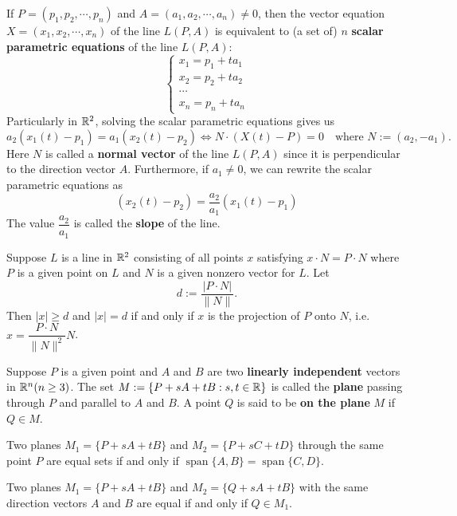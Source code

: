     \begin{remarkenv}
        If $P=(p_1,p_2,\cdots,p_n)$ and $A = (a_1,a_2,\cdots,a_n)\ne 0$, then the vector equation $X=(x_1,x_2,\cdots,x_n)$ of the line $L(P,A)$ is equivalent to (a set of) $n$ \textbf{scalar parametric equations} of the line $L(P,A)$:
        \[
        \begin{cases}
            x_1 = p_1 + t a_1 \\
            x_2 = p_2 + t a_2 \\
            \cdots \\
            x_n = p_n + t a_n
        \end{cases}
        \]
        Particularly in $\mathbb{R}^2$, solving the scalar parametric equations gives us
        \[
        a_2 (x_1(t) - p_1) = a_1 (x_2(t) - p_2) \Leftrightarrow N \cdot (X(t) - P) = 0 \quad \text{where } N := (a_2,-a_1).
        \]
        Here $N$ is called a \textbf{normal vector} of the line $L(P,A)$ since it is perpendicular to the direction vector $A$. Furthermore, if $a_1 \ne 0$, we can rewrite the scalar parametric equations as
        \[
        (x_2(t) - p_2) = \frac{a_2}{a_1} (x_1(t) - p_1) 
        \]
        The value $\dfrac{a_2}{a_1}$ is called the \textbf{slope} of the line.
    \end{remarkenv}
    \begin{theoremenv}
        Suppose $L$ is a line in $\mathbb{R}^2$ consisting of all points $x$ satisfying $x \cdot N = P \cdot N$ where $P$ is a given point on $L$ and $N$ is a given nonzero vector for $L$. Let
        $$ d:= \frac{|P\cdot N|}{\|N\|}.$$
        Then $|x| \ge d$ and $|x| = d$ if and only if $x$ is the projection of $P$ onto $N$, i.e. $x = \dfrac{P\cdot N}{\|N\|^2} N$.
    \end{theoremenv}
    \begin{definitionenv}
        Suppose $P$ is a given point and $A$ and $B$ are two \textbf{linearly independent} vectors in $\mathbb{R}^n(n\ge 3)$. The set $M:=\{ P + sA + tB : s,t\in \mathbb{R}\}$ is called the \textbf{plane} passing through $P$ and parallel to $A$ and $B$. A point $Q$ is said to be \textbf{on the plane} $M$ if $Q\in M$.
    \end{definitionenv}
    \begin{theoremenv}
        Two planes $M_1 = \{ P + sA + tB\} $ and $M_2 = \{ P + sC + tD\}$ through the same point $P$ are equal sets if and only if $\operatorname{span} \{A,B\} = \operatorname{span} \{C,D\}$.
    \end{theoremenv}
    \begin{theoremenv}
        Two planes $M_1 = \{ P + sA + tB\}$ and $M_2 = \{ Q + sA + tB\}$ with the same direction vectors $A$ and $B$ are equal if and only if $Q\in M_1$.
    \end{theoremenv}
